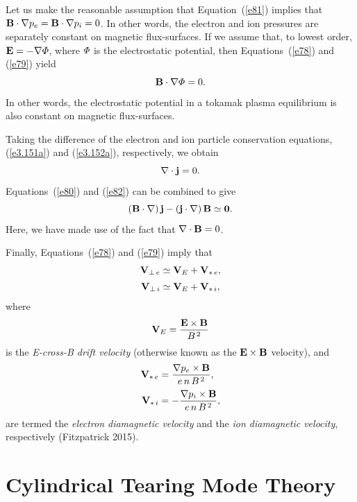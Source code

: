 \documentclass[notitlepage,12pt]{article}
\begin{document}
Let us make the reasonable assumption that Equation~(\ref{e81}) implies that ${\bf B}\cdot\nabla p_e={\bf B}\cdot\nabla
p_i=0$. In other words, the electron and ion pressures are separately constant on magnetic flux-surfaces. If we assume that, to lowest order, ${\bf E}=-\nabla{\mit\Phi}$, where ${\mit\Phi}$ is the electrostatic potential, then Equations~(\ref{e78})
and (\ref{e79}) yield
\begin{equation}
{\bf B}\cdot\nabla{\mit\Phi}=0.
\end{equation}
In other words,  the electrostatic potential in a tokamak plasma equilibrium  is also constant on magnetic flux-surfaces. 

 Taking the difference of the electron and ion particle
conservation equations, (\ref{e3.151a}) and (\ref{e3.152a}), respectively, we obtain
\begin{equation}\label{e82}
\nabla\cdot {\bf j} = 0.
\end{equation}
 Equations~(\ref{e80}) and (\ref{e82}) can be combined to give
\begin{equation}\label{e84}
({\bf B}\cdot\nabla)\,{\bf j } - ({\bf j}\cdot\nabla)\,{\bf B} \simeq {\bf 0}.
\end{equation}
Here, we have made use of the fact that $\nabla\cdot{\bf B}=0$. 

Finally, Equations~(\ref{e78}) and (\ref{e79}) imply that
\begin{align}
{\bf V}_{\perp\,e} &\simeq {\bf V}_E + {\bf V}_{\ast\,e},\\[0.5ex]
{\bf V}_{\perp\,i} &\simeq {\bf V}_E + {\bf V}_{\ast\,i},
\end{align}
where
\begin{equation}
{\bf V}_E = \frac{{\bf E}\times {\bf B}}{B^{\,2}}
\end{equation}
is the {\em E-cross-B drift velocity}\/ (otherwise known as  the ${\bf E}\times {\bf B}$ velocity), and
\begin{align}
{\bf V}_{\ast\,e}&= \frac{\nabla p_e\times {\bf B}}{e\,n\,B^{\,2}},\\[0.5ex]
{\bf V}_{\ast\,i}&=- \frac{\nabla p_i\times {\bf B}}{e\,n\,B^{\,2}},
\end{align}
are termed the {\em electron diamagnetic velocity}\/ and the {\em ion diamagnetic velocity}, respectively (Fitzpatrick 2015). 

\section{Cylindrical Tearing Mode Theory}\label{cyl}
\end{document}
